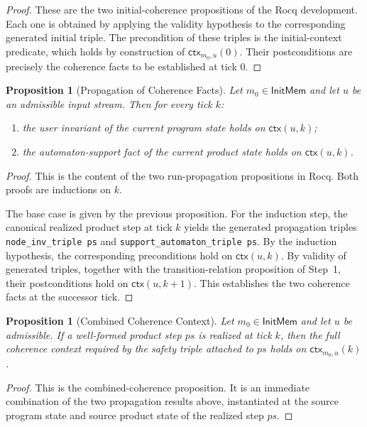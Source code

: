 \documentclass[11pt,a4paper]{article}
\newtheorem{proposition}[definition]{Proposition}
\newcommand{\ctx}{\mathsf{ctx}}
\begin{document}
\begin{proof}
These are the two initial-coherence propositions of the Rocq development. Each
one is obtained by applying the validity hypothesis to the corresponding
generated initial triple. The precondition of these triples is the
initial-context predicate, which holds by construction of \(\ctx_{m_0,u}(0)\).
Their postconditions are precisely the coherence facts to be established at
tick \(0\).
\end{proof}

\begin{proposition}[Propagation of Coherence Facts]
Let \(m_0 \in \mathsf{InitMem}\) and let \(u\) be an admissible input stream. Then for
every tick \(k\):
\begin{enumerate}[leftmargin=1.4em]
\item the user invariant of the current program state holds on \(\ctx(u,k)\);
\item the automaton-support fact of the current product state holds on
  \(\ctx(u,k)\).
\end{enumerate}
\end{proposition}

\begin{proof}
This is the content of the two run-propagation propositions in Rocq. Both
proofs are inductions on \(k\).

The base case is given by the previous proposition. For the induction step, the
canonical realized product step at tick \(k\) yields the generated propagation
triples \texttt{node\_inv\_triple ps} and
\texttt{support\_automaton\_triple ps}. By the induction hypothesis, the
corresponding preconditions hold on \(\ctx(u,k)\). By validity of generated
triples, together with the transition-relation proposition of Step~1, their
postconditions hold on \(\ctx(u,k+1)\). This establishes the two coherence facts
at the successor tick.
\end{proof}

\begin{proposition}[Combined Coherence Context]
Let \(m_0 \in \mathsf{InitMem}\) and let \(u\) be admissible. If a well-formed product
step \(ps\) is realized at tick \(k\), then the full coherence context required by
the safety triple attached to \(ps\) holds on \(\ctx_{m_0,u}(k)\).
\end{proposition}

\begin{proof}
This is the combined-coherence proposition. It is an immediate combination of
the two propagation results above, instantiated at the source program state
and source product state of the realized step \(ps\).
\end{proof}
\end{document}
